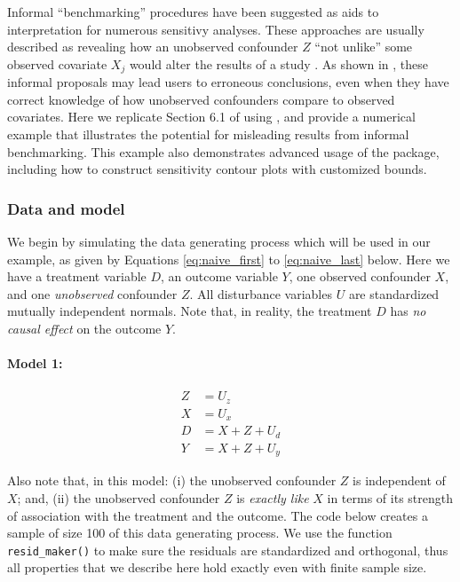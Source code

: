 \documentclass[
]{jss}
\begin{document}
Informal ``benchmarking'' procedures have been suggested as aids to
interpretation for numerous sensitivy analyses. These approaches are
usually described as revealing how an unobserved confounder \(Z\) ``not
unlike'' some observed covariate \(X_j\) would alter the results of a
study
\citep{imbens2003sensitivity, blackwell2013selection, hosman2010sensitivity, carnegie:jree2016, dorie2016flexible, hong:jebs2018}.
As shown in \cite{cinelli:jrssb2019}, these informal proposals may lead
users to erroneous conclusions, even when they have correct knowledge of
how unobserved confounders compare to observed covariates. Here we
replicate Section 6.1 of \citet{cinelli:jrssb2019} using
, and provide a numerical example that illustrates the
potential for misleading results from informal benchmarking. This
example also demonstrates advanced usage of the package, including how
to construct sensitivity contour plots with customized bounds.

\hypertarget{data-and-model}{%
\subsubsection{Data and model}\label{data-and-model}}

We begin by simulating the data generating process which will be used in
our example, as given by Equations \ref{eq:naive_first} to
\ref{eq:naive_last} below. Here we have a treatment variable \(D\), an
outcome variable \(Y\), one observed confounder \(X\), and one
\emph{unobserved} confounder \(Z\). All disturbance variables \(U\) are
standardized mutually independent normals. Note that, in reality, the
treatment \(D\) has \emph{no causal effect} on the outcome \(Y\).

\paragraph{Model 1:}

\begin{align}
Z &= U_{z}\label{eq:naive_first}\\
X &= U_{x}\\
D &= X + Z + U_d\\
Y &= X + Z + U_y \label{eq:naive_last}
\end{align}

Also note that, in this model: (i) the unobserved confounder \(Z\) is
independent of \(X\); and, (ii) the unobserved confounder \(Z\) is
\emph{exactly like} \(X\) in terms of its strength of association with
the treatment and the outcome. The code below creates a sample of size
100 of this data generating process. We use the function
\texttt{resid\_maker()} to make sure the residuals are standardized and
orthogonal, thus all properties that we describe here hold exactly even
with finite sample size.
\end{document}
